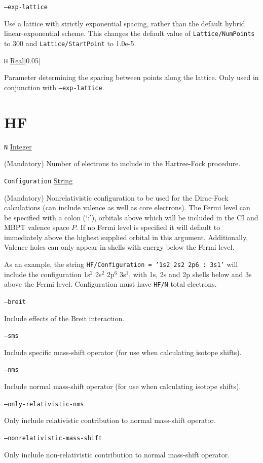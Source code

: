 \documentclass{report}
\begin{document}
\texttt{--exp-lattice}
\begin{adjustwidth}{1cm}{}
Use a lattice with strictly exponential spacing, rather than the default hybrid linear-exponential
scheme. This changes the default value of \texttt{Lattice/NumPoints} to 300 and
\texttt{Lattice/StartPoint} to 1.0e-5.
\end{adjustwidth}

\texttt{H} \uline{Real}[0.05]
\begin{adjustwidth}{1cm}{}
Parameter determining the spacing between points along the lattice. Only used in conjunction with
\texttt{--exp-lattice}.
\end{adjustwidth}

\section{HF}

\texttt{N} \uline{Integer}
\begin{adjustwidth}{1cm}{}
(Mandatory) Number of electrons to include in the Hartree-Fock procedure.
\end{adjustwidth}
\texttt{Configuration} \uline{String} 
\begin{adjustwidth}{1cm}{}
(Mandatory) Nonrelativistic configuration to be used for the
Dirac-Fock calculations (can include valence as well as core electrons). The Fermi level can be specified
with a colon (`:'), orbitals above which will be included in the CI and MBPT valence space $P$. If no
Fermi level is specified it will default to immediately above the highest supplied orbital in this
argument. Additionally, Valence holes can only appear in shells with energy below the Fermi level.
                                                                               
As an example, the string \texttt{HF/Configuration = '1s2 2s2 2p6~:~3s1'} will include the configuration
1s$^2$ 2s$^2$ 2p$^6$ 3s$^1$, with 1s, 2s and 2p shells below and 3s above the Fermi level.
Configuration must have \texttt{HF/N} total electrons.
\end{adjustwidth}

\texttt{--breit} 
\begin{adjustwidth}{1cm}{}
Include effects of the Breit interaction.
\end{adjustwidth}
\texttt{--sms} 
\begin{adjustwidth}{1cm}{}
Include specific mass-shift operator (for use when calculating isotope shifts).
\end{adjustwidth}
\texttt{--nms} 
\begin{adjustwidth}{1cm}{}
Include normal mass-shift operator (for use when calculating isotope shifts).
\end{adjustwidth}
\texttt{--only-relativistic-nms} 
\begin{adjustwidth}{1cm}{}
Only include relativistic contribution to normal mass-shift operator.
\end{adjustwidth}
\texttt{--nonrelativistic-mass-shift} 
\begin{adjustwidth}{1cm}{}
Only include non-relativistic contribution to normal mass-shift operator.
\end{adjustwidth}
\end{document}
